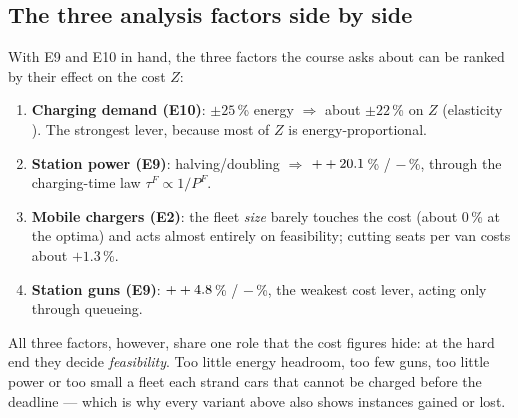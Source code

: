 \subsection{The three analysis factors side by side}

With E9 and E10 in hand, the three factors the course asks about can be ranked by their effect on the cost $Z$:
\begin{enumerate}
  \item \textbf{Charging demand (E10)}: $\pm25$\,\% energy $\Rightarrow$ about $\pm22$\,\% on $Z$ (elasticity \feTenElastic). The strongest lever, because most of $Z$ is energy-proportional.
  \item \textbf{Station power (E9)}: halving/doubling $\Rightarrow$ $++20.1$\,\% / $-$\feNinePowDblDzAbs\,\%, through the charging-time law $\tau^F\propto1/P^F$.
  \item \textbf{Mobile chargers (E2)}: the fleet \emph{size} barely touches the cost (about 0\,\% at the optima) and acts almost entirely on feasibility; cutting seats per van costs about $+1.3$\,\%.
  \item \textbf{Station guns (E9)}: $++4.8$\,\% / $-$\feNineGunsDblDzAbs\,\%, the weakest cost lever, acting only through queueing.
\end{enumerate}
All three factors, however, share one role that the cost figures hide: at the hard end they decide \emph{feasibility}. Too little energy headroom, too few guns, too little power or too small a fleet each strand cars that cannot be charged before the deadline --- which is why every variant above also shows instances gained or lost.

